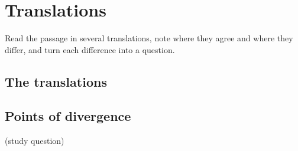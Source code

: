 \chapter{Translations}\label{cap:traducoes}

\begin{objetivo}
Read the passage in several translations, note where they agree and where they differ, and turn each difference into a question.
\end{objetivo}

\section{The translations}

\section{Points of divergence}

\begin{pergunta}
(study question)
\end{pergunta}

